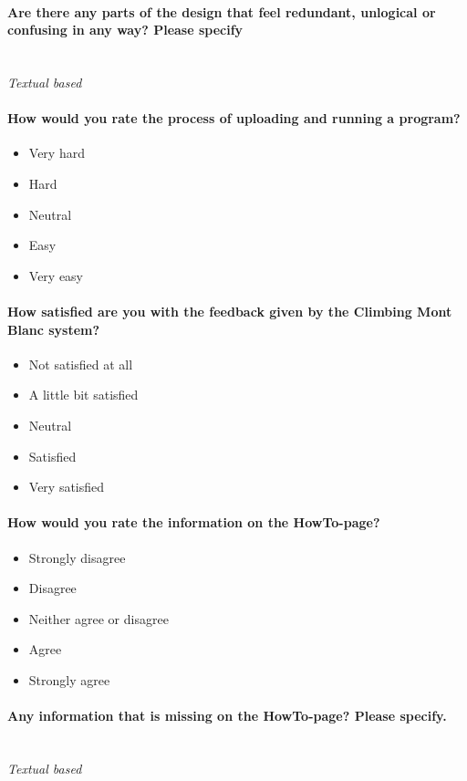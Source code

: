 \paragraph*{Are there any parts of the design that feel redundant, unlogical or confusing in any way? Please specify} \hfill \\
\textit{Textual based}

\paragraph*{How would you rate the process of uploading and running a program?} \hfill
\begin{itemize}
  \item Very hard
  \item Hard
  \item Neutral
  \item Easy
  \item Very easy
\end{itemize}

\paragraph*{How satisfied are you with the feedback given by the Climbing Mont Blanc system?} \hfill
\begin{itemize}
  \item Not satisfied at all
  \item A little bit satisfied
  \item Neutral
  \item Satisfied
  \item Very satisfied
\end{itemize}

\paragraph*{How would you rate the information on the HowTo-page?} \hfill
\begin{itemize}
  \item Strongly disagree
  \item Disagree
  \item Neither agree or disagree
  \item Agree
  \item Strongly agree
\end{itemize}

\paragraph*{Any information that is missing on the HowTo-page? Please specify.} \hfill \\
\textit{Textual based}

